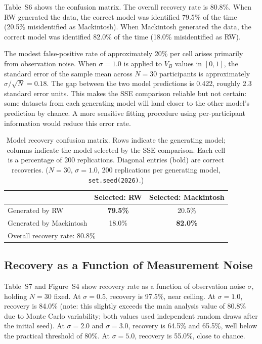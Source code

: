 \documentclass[11pt,a4paper]{article}
\begin{document}
Table~S6 shows the confusion matrix. The overall recovery rate is 80.8\%. When RW generated the data, the correct model was identified 79.5\% of the time (20.5\% misidentified as Mackintosh). When Mackintosh generated the data, the correct model was identified 82.0\% of the time (18.0\% misidentified as RW).

The modest false-positive rate of approximately 20\% per cell arises primarily from observation noise. When $\sigma = 1.0$ is applied to $V_B$ values in $[0, 1]$, the standard error of the sample mean across $N = 30$ participants is approximately $\sigma/\sqrt{N} = 0.18$. The gap between the two model predictions is 0.422, roughly 2.3 standard error units. This makes the SSE comparison reliable but not certain: some datasets from each generating model will land closer to the other model's prediction by chance. A more sensitive fitting procedure using per-participant information would reduce this error rate.

\begin{table}[htbp]
\centering
\small
\caption{Model recovery confusion matrix. Rows indicate the generating model; columns indicate the model selected by the SSE comparison. Each cell is a percentage of 200 replications. Diagonal entries (bold) are correct recoveries. ($N = 30$, $\sigma = 1.0$, 200 replications per generating model, \texttt{set.seed(2026)}.)}
\label{tab:s6_confusion}
\begin{tabular}{lcc}
\toprule
 & Selected: RW & Selected: Mackintosh \\
\midrule
Generated by RW & \textbf{79.5\%} & 20.5\% \\
Generated by Mackintosh & 18.0\% & \textbf{82.0\%} \\
\bottomrule
\multicolumn{3}{l}{\small Overall recovery rate: 80.8\%}
\end{tabular}
\end{table}

\subsection{Recovery as a Function of Measurement Noise}
\label{sec:s3_noise}

Table~S7 and Figure~S4 show recovery rate as a function of observation noise $\sigma$, holding $N = 30$ fixed. At $\sigma = 0.5$, recovery is 97.5\%, near ceiling. At $\sigma = 1.0$, recovery is 84.0\% (note: this slightly exceeds the main analysis value of 80.8\% due to Monte Carlo variability; both values used independent random draws after the initial seed). At $\sigma = 2.0$ and $\sigma = 3.0$, recovery is 64.5\% and 65.5\%, well below the practical threshold of 80\%. At $\sigma = 5.0$, recovery is 55.0\%, close to chance.
\end{document}
